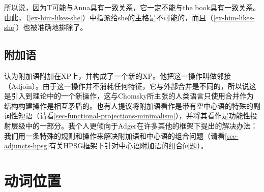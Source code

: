所以说，因为T可能与Anna具有一致关系，它一定不能与the book具有一致关系。由此，（\ref{ex-him-likes-she}）中指派给she的主格是不可能的，而且（\ref{ex-him-likes-she}）也被准确地排除了。

\subsection{附加语}

 \citet[\S~4.2.3]{Adger2003a}认为附加语附加在XP上，并构成了一个新的XP。他把这一操作叫做邻接（Adjoin）。由于这一操作并不消耗任何特征，它与外部合并是不同的，所以说这是引入到理论中的一个新操作，这与Chomsky所主张的人类语言只使用合并作为结构构建操作是相互矛盾的。也有人提议将附加语看作是带有空中心语的特殊的副词性短语（请看\ref{sec-functional-projections-minimalism}），并将其看作是功能性投射层级中的一部分。我个人更倾向于Adger在许多其他的框架下提出的解决办法：我们用一条特殊的规则和操作来解决附加语和中心语的组合问题（请看\ref{sec-adjuncts-hpsg}有关HPSG框架下针对中心语附加语的组合问题）。


\section{动词位置}
\label{sec-verb-position-MP}

